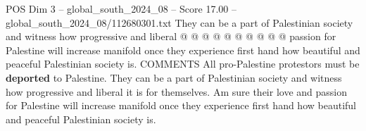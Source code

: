 \begin{textsample}{POS Dim 3 – global\_south\_2024\_08 – Score 17.00 – global\_south\_2024\_08/112680301.txt}
They can be a part of Palestinian society and witness how progressive and liberal @ @ @ @ @ @ @ @ @ @ passion for Palestine will increase manifold once they experience first hand how beautiful and peaceful Palestinian society is.
COMMENTS All pro-Palestine protestors must be \textbf{deported} to Palestine.
They can be a part of Palestinian society and witness how progressive and liberal it is for themselves.
Am sure their love and passion for Palestine will increase manifold once they experience first hand how beautiful and peaceful Palestinian society is.

\end{textsample}

